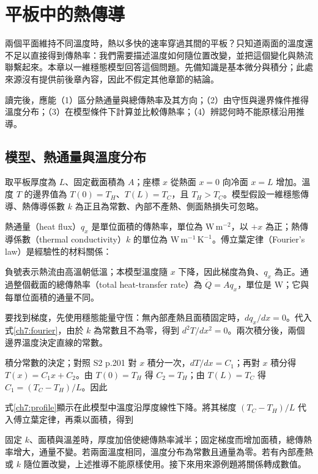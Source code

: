 \setcounter{section}{6}
\section{平板中的熱傳導}\label{ch7}
兩個平面維持不同溫度時，熱以多快的速率穿過其間的平板？只知道兩面的溫度還不足以直接得到傳熱率：我們需要描述溫度如何隨位置改變，並把這個變化與熱流聯繫起來。本章以一維穩態模型回答這個問題。先備知識是基本微分與積分；此處來源沒有提供前後章內容，因此不假定其他章節的結論。

讀完後，應能（1）區分熱通量與總傳熱率及其方向；（2）由守恆與邊界條件推得溫度分布；（3）在模型條件下計算並比較傳熱率；（4）辨認何時不能原樣沿用推導。

\subsection{模型、熱通量與溫度分布}\label{ch7:model}
取平板厚度為 $L$、固定截面積為 $A$；座標 $x$ 從熱面 $x=0$ 向冷面 $x=L$ 增加。溫度 $T$ 的邊界值為 $T(0)=T_H$、$T(L)=T_C$，且 $T_H>T_C$。模型假設一維穩態傳導、熱傳導係數 $k$ 為正且為常數、內部不產熱、側面熱損失可忽略。

熱通量（heat flux）$q_x$ 是單位面積的傳熱率，單位為 $\mathrm{W\,m^{-2}}$，以 $+x$ 為正；熱傳導係數（thermal conductivity）$k$ 的單位為 $\mathrm{W\,m^{-1}\,K^{-1}}$。傅立葉定律（Fourier's law）是經驗性的材料關係：

負號表示熱流由高溫朝低溫；本模型溫度隨 $x$ 下降，因此梯度為負、$q_x$ 為正。通過整個截面的總傳熱率（total heat-transfer rate）為 $\dot Q=Aq_x$，單位是 $\mathrm W$；它與每單位面積的通量不同。

要找到梯度，先使用穩態能量守恆：無內部產熱且面積固定時，$dq_x/dx=0$。代入式\eqref{ch7:fourier}，由於 $k$ 為常數且不為零，得到 $d^2T/dx^2=0$。兩次積分後，兩個邊界溫度決定直線的常數。
\begin{aisupplement}{積分常數的決定；對照 S2 p.201}
對 $x$ 積分一次，$dT/dx=C_1$；再對 $x$ 積分得 $T(x)=C_1x+C_2$。由 $T(0)=T_H$ 得 $C_2=T_H$；由 $T(L)=T_C$ 得 $C_1=(T_C-T_H)/L$。因此

\end{aisupplement}
式\eqref{ch7:profile}顯示在此模型中溫度沿厚度線性下降。將其梯度 $(T_C-T_H)/L$ 代入傅立葉定律，再乘以面積，得到

固定 $k$、面積與溫差時，厚度加倍使總傳熱率減半；固定梯度而增加面積，總傳熱率增大，通量不變。若兩面溫度相同，溫度分布為常數且通量為零。若有內部產熱或 $k$ 隨位置改變，上述推導不能原樣使用。接下來用來源例題將關係轉成數值。

